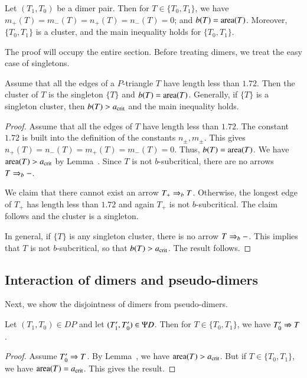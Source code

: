 \begin{theorem} 
  Let $(T_1,T_0)$ be a dimer pair.  Then for $T\in\{T_0,T_1\}$, we have
  $m_+(T)=m_-(T) = n_+(T)=n_-(T) = 0$; and $b(T) = {\operatorname{area}}(T)$.
  Moreover, $\{T_0,T_1\}$ is a cluster, and the main inequality holds
  for $\{T_0,T_1\}$.
\end{theorem}

The proof will occupy the entire section.  Before treating dimers, we
treat the easy case of singletons.

\begin{lemma}  
  Assume that all the edges of a $P$-triangle $T$ have length less
  than $1.72$.  Then the cluster of $T$ is the singleton $\{T\}$ and
  $b(T) ={\operatorname{area}}(T)$.  Generally, if $\{T\}$ is a singleton
  cluster, then $b(T) > a_\text{crit}$ and the main inequality holds.
\end{lemma}

\begin{proof} 
  Assume that all the edges of $T$ have length less than $1.72$.  The
  constant $1.72$ is built into the definition of the constants
  $n_\pm,m_\pm$. This gives $n_+(T)=n_-(T) = m_+(T)=m_-(T)=0$.  Thus,
  $b(T)={\operatorname{area}}(T)$.  We have ${\operatorname{area}}(T) > a_\text{crit}$ by
  Lemma~.  Since $T$ is not $b$-subcritical, there are
  no arrows $T\Rightarrow_{b} -$.

  We claim that there cannot exist an arrow $T_+\Rightarrow_{b} T$.  Otherwise,
  the longest edge of $T_+$ has length less than $1.72$ and again
  $T_+$ is not $b$-subcritical.  The claim follows and the cluster is
  a singleton.

  In general, if $\{T\}$ is any singleton cluster, there is no arrow
  $T\Rightarrow_{b} -$.  This implies that $T$ is not $b$-subcritical, so that
  $b(T) > a_\text{crit}$.  The result follows.
\end{proof}

\subsection{Interaction of dimers and pseudo-dimers}

Next, we show the disjointness of dimers from pseudo-dimers.

\begin{lemma}
  Let $(T_1,T_0)\in DP$ and let $(T'_1,T'_0)\in\Psi D$.  Then for
  $T\in\{T_0,T_1\}$, we have $T'_0\nRightarrow T$.
\end{lemma}

\begin{proof} 
  Assume $T'_0\Rightarrow T$.  By Lemma~, we have
  ${\operatorname{area}}(T)>a_\text{crit}$.  But if $T\in\{T_0,T_1\}$, we have
  ${\operatorname{area}}(T)=a_\text{crit}$.  This gives the result.
\end{proof}


